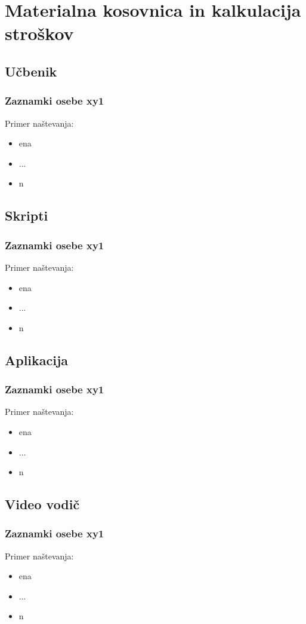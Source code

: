 \chapter{Materialna kosovnica in kalkulacija stroškov}\label{chap20SI}

\section{Učbenik}
\subsection{Zaznamki osebe xy1}
Primer naštevanja:
\begin{itemize}
	\item ena
	\item ...
	\item n	
\end{itemize}

\section{Skripti}
\subsection{Zaznamki osebe xy1}
Primer naštevanja:
\begin{itemize}
	\item ena
	\item ...
	\item n	
\end{itemize}

\section{Aplikacija}
\subsection{Zaznamki osebe xy1}
Primer naštevanja:
\begin{itemize}
	\item ena
	\item ...
	\item n	
\end{itemize}

\section{Video vodič}
\subsection{Zaznamki osebe xy1}
Primer naštevanja:
\begin{itemize}
	\item ena
	\item ...
	\item n	
\end{itemize}